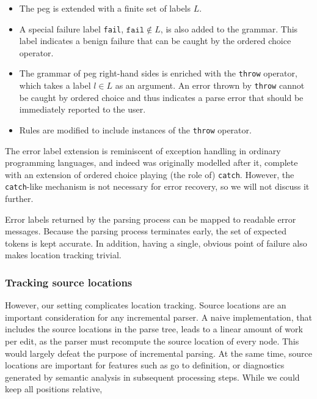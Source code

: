 
\begin{itemize}
	\item The \acrlong{peg} is extended with a finite set of labels $L$.
	\item A special failure label \texttt{fail}, $\texttt{fail} \not \in L$, is
	also added to the grammar. This label indicates a benign failure that can be
	caught by the ordered choice operator.
	\item The grammar of \acrlong{peg} right-hand sides is enriched with the
	\texttt{throw} operator, which takes a label $l \in L$ as an argument. An
	error thrown by \texttt{throw} cannot be caught by ordered choice and thus
	indicates a parse error that should be immediately reported to the user.
	\item Rules are modified to include instances of the \texttt{throw}
	operator.
\end{itemize}

The error label extension is reminiscent of exception handling in ordinary
programming languages, and indeed was originally modelled after it, complete
with an extension of ordered choice playing (the role of)
\texttt{catch}\cite{demedeiros2016parsing}. However, the \texttt{catch}-like
mechanism is not necessary for error recovery, so we will not discuss it
further.

Error labels returned by the parsing process can be mapped to readable error
messages. Because the parsing process terminates early, the set of expected
tokens is kept accurate. In addition, having a single, obvious point of failure
also makes location tracking trivial.

\subsubsection*{Tracking source locations}


However, our setting complicates location tracking. Source locations are an
important consideration for any incremental parser. A naive implementation, that
includes the source locations in the parse tree, leads to a linear amount of
work per edit, as the parser must recompute the source location of every node.
This would largely defeat the purpose of incremental parsing. At the same time,
source locations are important for features such as go to definition, or
diagnostics generated by semantic analysis in subsequent processing steps. While
we could keep all positions relative,

